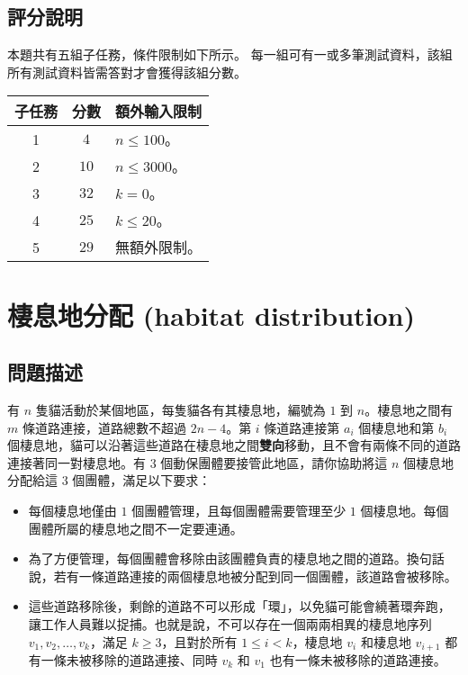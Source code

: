 \subsection{評分說明}

本題共有五組子任務，條件限制如下所示。
每一組可有一或多筆測試資料，該組所有測試資料皆需答對才會獲得該組分數。

\begin{longtable}[]{@{}ccl@{}}
\toprule
子任務 & 分數 & 額外輸入限制 \\
\midrule
\endhead
1 & \(4\) & \(n \le 100\)。 \\
2 & \(10\) & \(n \le 3000\)。 \\
3 & \(32\) & \(k = 0\)。 \\
4 & \(25\) & \(k \le 20\)。 \\
5 & \(29\) & 無額外限制。 \\
\bottomrule
\end{longtable}

\section{棲息地分配 (habitat distribution)}

\subsection{問題描述}

有 \(n\) 隻貓活動於某個地區，每隻貓各有其棲息地，編號為 \(1\) 到
\(n\)。棲息地之間有 \(m\) 條道路連接，道路總數不超過 \(2n-4\)。第 \(i\)
條道路連接第 \(a_i\) 個棲息地和第 \(b_i\)
個棲息地，貓可以沿著這些道路在棲息地之間\textbf{雙向}移動，且不會有兩條不同的道路連接著同一對棲息地。有
\(3\) 個動保團體要接管此地區，請你協助將這 \(n\) 個棲息地分配給這 \(3\)
個團體，滿足以下要求：

\begin{itemize}
\tightlist
\item
  每個棲息地僅由 \(1\) 個團體管理，且每個團體需要管理至少 \(1\)
  個棲息地。每個團體所屬的棲息地之間不一定要連通。
\item
  為了方便管理，每個團體會移除由該團體負責的棲息地之間的道路。換句話說，若有一條道路連接的兩個棲息地被分配到同一個團體，該道路會被移除。
\item
  這些道路移除後，剩餘的道路不可以形成「環」，以免貓可能會繞著環奔跑，讓工作人員難以捉捕。也就是說，不可以存在一個兩兩相異的棲息地序列
  \(v_1,v_2,\ldots, v_k\)\hspace{0pt}，滿足 \(k \ge 3\)，且對於所有
  \(1\le i < k\)，棲息地 \(v_i\)\hspace{0pt} 和棲息地
  \(v_{i+1}\)\hspace{0pt} 都有一條未被移除的道路連接、同時
  \(v_k\)\hspace{0pt} 和 \(v_1\)\hspace{0pt}
  也有一條未被移除的道路連接。
\end{itemize}

